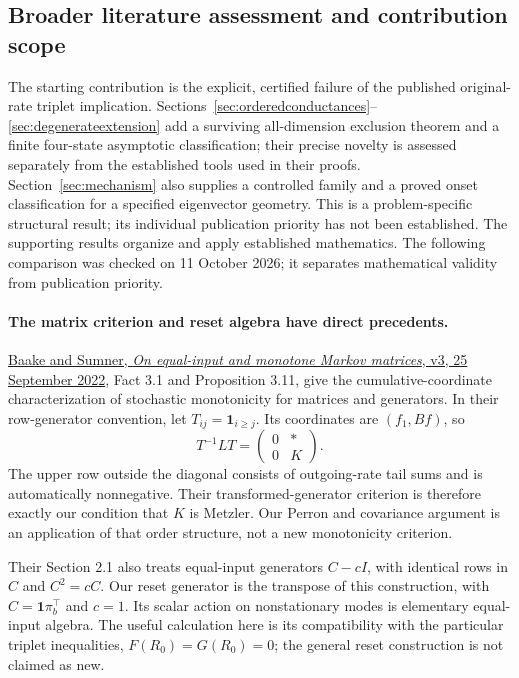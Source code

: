 \subsection{Broader literature assessment and contribution scope}\label{sec:novelty}
The starting contribution is the explicit, certified failure of the published original-rate triplet implication. Sections~\ref{sec:orderedconductances}--\ref{sec:degenerateextension} add a surviving all-dimension exclusion theorem and a finite four-state asymptotic classification; their precise novelty is assessed separately from the established tools used in their proofs. Section~\ref{sec:mechanism} also supplies a controlled family and a proved onset classification for a specified eigenvector geometry. This is a problem-specific structural result; its individual publication priority has not been established. The supporting results organize and apply established mathematics. The following comparison was checked on 11 October 2026; it separates mathematical validity from publication priority.

\paragraph{The matrix criterion and reset algebra have direct precedents.}
\href{https://arxiv.org/abs/2007.11433v3}{Baake and Sumner, \emph{On equal-input and monotone Markov matrices}, v3, 25 September 2022}, Fact 3.1 and Proposition 3.11, give the cumulative-coordinate characterization of stochastic monotonicity for matrices and generators. In their row-generator convention, let $T_{ij}=\mathbf1_{i\geq j}$. Its coordinates are $(f_1,Bf)$, so
\[
T^{-1}LT=\begin{pmatrix}0&*\\0&K\end{pmatrix}.
\]
The upper row outside the diagonal consists of outgoing-rate tail sums and is automatically nonnegative. Their transformed-generator criterion is therefore exactly our condition that $K$ is Metzler. Our Perron and covariance argument is an application of that order structure, not a new monotonicity criterion.

Their Section 2.1 also treats equal-input generators $C-cI$, with identical rows in $C$ and $C^2=cC$. Our reset generator is the transpose of this construction, with $C=\mathbf1\pi_b^\top$ and $c=1$. Its scalar action on nonstationary modes is elementary equal-input algebra. The useful calculation here is its compatibility with the particular triplet inequalities, $F(R_0)=G(R_0)=0$; the general reset construction is not claimed as new.

